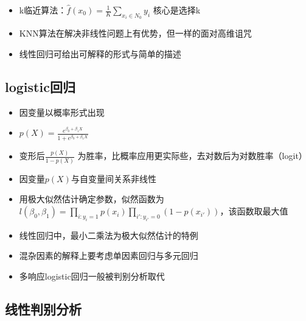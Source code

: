 \documentclass[]{book}
\providecommand{\tightlist}{%
  \setlength{\itemsep}{0pt}\setlength{\parskip}{0pt}}
\begin{document}
\begin{itemize}
\tightlist
\item
  k临近算法：\(\hat f(x_0) = \frac{1}{K} \sum_{x_i \in N_0} y_i\) 核心是选择k
\item
  KNN算法在解决非线性问题上有优势，但一样的面对高维诅咒
\item
  线性回归可给出可解释的形式与简单的描述
\end{itemize}

\hypertarget{logisticux56deux5f52}{%
\subsection{logistic回归}\label{logisticux56deux5f52}}

\begin{itemize}
\tightlist
\item
  因变量以概率形式出现
\item
  \(p(X) = \frac {e^{\beta_0 + \beta_1 X}}{1 + e^{\beta_0 + \beta_1 X}}\)
\item
  变形后\(\frac {p(X)}{1 - p(X)}\) 为胜率，比概率应用更实际些，去对数后为对数胜率（logit）
\item
  因变量\(p(X)\)与自变量间关系非线性
\item
  用极大似然估计确定参数，似然函数为\(l(\beta_0, \beta_1) = \prod_{i:y_i = 1} p(x_i)\prod_{i':y_{i'} = 0} (1 - p(x_{i'}))\)，该函数取最大值
\item
  线性回归中，最小二乘法为极大似然估计的特例
\item
  混杂因素的解释上要考虑单因素回归与多元回归
\item
  多响应logistic回归一般被判别分析取代
\end{itemize}

\hypertarget{ux7ebfux6027ux5224ux522bux5206ux6790}{%
\subsection{线性判别分析}\label{ux7ebfux6027ux5224ux522bux5206ux6790}}
\end{document}
